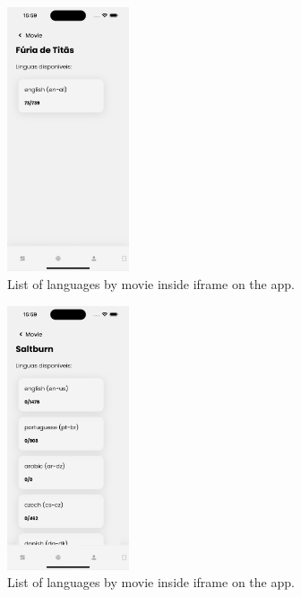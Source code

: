 \documentclass[12pt]{article}
\begin{document}
  \begin{figure}[!h]
    \centering
    \caption{
     List of languages by movie inside iframe on the app.
    }
    \label{fig:app4}
    \includegraphics[width=0.32\textwidth]{assets/17.png}
  \end{figure}

  \begin{figure}[!h]
    \centering
    \caption{
     List of languages by movie inside iframe on the app.
    }
    \label{fig:app5}
    \includegraphics[width=0.32\textwidth]{assets/18.png}
  \end{figure}
\end{document}
